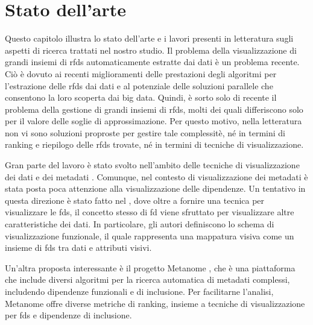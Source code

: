 \chapter{Stato dell'arte}%
\label{cap2:stato_arte}
%

Questo capitolo illustra lo stato dell'arte e i lavori presenti in letteratura sugli aspetti di ricerca trattati nel nostro studio. Il problema della visualizzazione di grandi insiemi di \acrshort{rfds} automaticamente estratte dai dati \`{e} un problema recente. Ci\`{o} \`{e} dovuto ai recenti miglioramenti delle prestazioni degli algoritmi per l'estrazione delle \acrshort{rfds} dai dati e al potenziale delle soluzioni parallele che consentono la loro scoperta dai big data. Quindi, \`{e} sorto solo di recente il problema della gestione di grandi insiemi di \acrshort{rfds}, molti dei quali differiscono solo per il valore delle soglie di approssimazione. Per questo motivo, nella letteratura non vi sono soluzioni proproste per gestire tale complessit\`{e}, n\'{e} in termini di ranking e riepilogo delle \acrshort{rfds} trovate, n\'{e} in termini di tecniche di visualizzazione.\par
Gran parte del lavoro \`{e} stato svolto nell'ambito delle tecniche di visualizzazione dei dati e dei metadati \cite{topicmodeling}. Comunque, nel contesto di visualizzazione dei metadati \`{e} stata posta poca attenzione alla visualizzazione delle dipendenze. Un tentativo in questa direzione \`{e} stato fatto nel \cite{frameworktoanalyzeinfo}, dove oltre a fornire una tecnica per visualizzare le \acrshort{fds}, il concetto stesso di \acrshort{fd} viene sfruttato per visualizzare altre caratteristiche dei dati. In particolare, gli autori definiscono lo schema di visualizzazione funzionale, il quale rappresenta una mappatura visiva come un insieme di \acrshort{fds} tra dati e attributi visivi.\par
Un'altra proposta interessante \`{e} il progetto Metanome \cite{dataprofilingwithmetanome}, che \`{e} una piattaforma che include diversi algoritmi per la ricerca automatica di metadati complessi, includendo dipendenze funzionali e di inclusione. Per facilitarne l'analisi, Metanome offre diverse metriche di ranking, insieme a tecniche di visualizzazione per \acrshort{fds} e dipendenze di inclusione.\par
